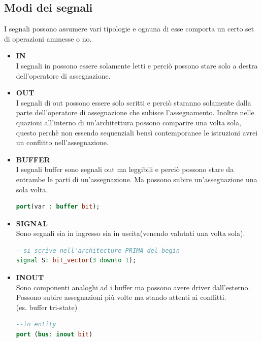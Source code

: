 \documentclass[a4paper]{book}
\begin{document}
\subsection{Modi dei segnali}

I segnali possono assumere vari tipologie e ognuna di esse comporta un certo set di operazioni ammesse o no.

\begin{itemize}

\item\textbf{IN}\\
I segnali in possono essere solamente letti e perciò possono stare solo a destra dell'operatore di assegnazione.

\item\textbf{OUT}\\
I segnali di out possono essere solo scritti e perciò staranno solamente dalla parte dell'operatore di assegnazione che subisce l'assegnamento.
Inoltre nelle quazioni all'interno di un'architettura possono comparire una volta sola, questo perchè non essendo sequenziali bensì contemporanee le istruzioni avrei un conflitto nell'assegnazione.

\item\textbf{BUFFER}\\
I segnali buffer sono segnali out ma leggibili e perciò possono stare da entrambe le parti di un'assegnazione.
Ma possono subire un'assegnazione una sola volta.

\begin{lstlisting}[language=VHDL]
port(var : buffer bit);
\end{lstlisting}

\item\textbf{SIGNAL}\\
Sono segnali sia in ingresso sia in uscita(venendo valutati una volta sola).

\begin{lstlisting}[language=VHDL]
--si scrive nell'architecture PRIMA del begin
signal S: bit_vector(3 downto 1);
\end{lstlisting}

\item\textbf{INOUT}\\
Sono componenti analoghi ad i buffer ma possono avere driver dall'esterno.\\
Possono subire assegnazioni più volte ma stando attenti ai conflitti.\\(es. buffer tri-state)

\begin{lstlisting}[language=VHDL]
--in entity
port (bus: inout bit)
\end{lstlisting}


\end{itemize}
\end{document}
